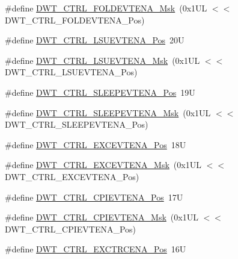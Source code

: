 \begin{DoxyCompactItemize}
\item 
\#define \mbox{\hyperlink{group___c_m_s_i_s___d_w_t_ga717e679d775562ae09185a3776b1582f}{D\+W\+T\+\_\+\+C\+T\+R\+L\+\_\+\+F\+O\+L\+D\+E\+V\+T\+E\+N\+A\+\_\+\+Msk}}~(0x1\+U\+L $<$$<$ D\+W\+T\+\_\+\+C\+T\+R\+L\+\_\+\+F\+O\+L\+D\+E\+V\+T\+E\+N\+A\+\_\+\+Pos)
\item 
\#define \mbox{\hyperlink{group___c_m_s_i_s___d_w_t_gaea5d1ee72188dc1d57b54c60a9f5233e}{D\+W\+T\+\_\+\+C\+T\+R\+L\+\_\+\+L\+S\+U\+E\+V\+T\+E\+N\+A\+\_\+\+Pos}}~20U
\item 
\#define \mbox{\hyperlink{group___c_m_s_i_s___d_w_t_gac47427f455fbc29d4b6f8a479169f2b2}{D\+W\+T\+\_\+\+C\+T\+R\+L\+\_\+\+L\+S\+U\+E\+V\+T\+E\+N\+A\+\_\+\+Msk}}~(0x1\+U\+L $<$$<$ D\+W\+T\+\_\+\+C\+T\+R\+L\+\_\+\+L\+S\+U\+E\+V\+T\+E\+N\+A\+\_\+\+Pos)
\item 
\#define \mbox{\hyperlink{group___c_m_s_i_s___d_w_t_ga9c6d62d121164013a8e3ee372f17f3e5}{D\+W\+T\+\_\+\+C\+T\+R\+L\+\_\+\+S\+L\+E\+E\+P\+E\+V\+T\+E\+N\+A\+\_\+\+Pos}}~19U
\item 
\#define \mbox{\hyperlink{group___c_m_s_i_s___d_w_t_ga2f431b3734fb840daf5b361034856da9}{D\+W\+T\+\_\+\+C\+T\+R\+L\+\_\+\+S\+L\+E\+E\+P\+E\+V\+T\+E\+N\+A\+\_\+\+Msk}}~(0x1\+U\+L $<$$<$ D\+W\+T\+\_\+\+C\+T\+R\+L\+\_\+\+S\+L\+E\+E\+P\+E\+V\+T\+E\+N\+A\+\_\+\+Pos)
\item 
\#define \mbox{\hyperlink{group___c_m_s_i_s___d_w_t_gaf4e73f548ae3e945ef8b1d9ff1281544}{D\+W\+T\+\_\+\+C\+T\+R\+L\+\_\+\+E\+X\+C\+E\+V\+T\+E\+N\+A\+\_\+\+Pos}}~18U
\item 
\#define \mbox{\hyperlink{group___c_m_s_i_s___d_w_t_gab7ee0def33423b5859ca4030dff63b58}{D\+W\+T\+\_\+\+C\+T\+R\+L\+\_\+\+E\+X\+C\+E\+V\+T\+E\+N\+A\+\_\+\+Msk}}~(0x1\+U\+L $<$$<$ D\+W\+T\+\_\+\+C\+T\+R\+L\+\_\+\+E\+X\+C\+E\+V\+T\+E\+N\+A\+\_\+\+Pos)
\item 
\#define \mbox{\hyperlink{group___c_m_s_i_s___d_w_t_ga9fff0b71fb0be1499f5180c6bce1fc8f}{D\+W\+T\+\_\+\+C\+T\+R\+L\+\_\+\+C\+P\+I\+E\+V\+T\+E\+N\+A\+\_\+\+Pos}}~17U
\item 
\#define \mbox{\hyperlink{group___c_m_s_i_s___d_w_t_ga189089c30aade60b983df17ad2412f6f}{D\+W\+T\+\_\+\+C\+T\+R\+L\+\_\+\+C\+P\+I\+E\+V\+T\+E\+N\+A\+\_\+\+Msk}}~(0x1\+U\+L $<$$<$ D\+W\+T\+\_\+\+C\+T\+R\+L\+\_\+\+C\+P\+I\+E\+V\+T\+E\+N\+A\+\_\+\+Pos)
\item 
\#define \mbox{\hyperlink{group___c_m_s_i_s___d_w_t_ga05f13b547a9a1e63e003ee0bc6446d0d}{D\+W\+T\+\_\+\+C\+T\+R\+L\+\_\+\+E\+X\+C\+T\+R\+C\+E\+N\+A\+\_\+\+Pos}}~16U
\item 
$$
\end{DoxyCompactItemize}
